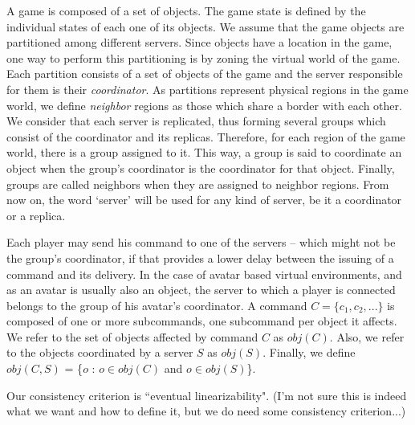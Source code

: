 \documentclass[times, 10pt]{article}
\begin{document}
A game is composed of a set of objects. The game state is defined by the individual states of each one of its objects. We assume that the game objects are partitioned among different servers. Since objects have a location in the game, one way to perform this partitioning is by zoning the virtual world of the game. Each partition consists of a set of objects of the game and the server responsible for them is their \emph{coordinator}. As partitions represent physical regions in the game world, we define \emph{neighbor} regions as those which share a border with each other. We consider that each server is replicated, thus forming several groups which consist of the coordinator and its replicas. Therefore, for each region of the game world, there is a group assigned to it. This way, a group is said to coordinate an object when the group's coordinator is the coordinator for that object. Finally, groups are called neighbors when they are assigned to neighbor regions. From now on, the word `server' will be used for any kind of server, be it a coordinator or a replica.

Each player may send his command to one of the servers -- which might not be the group's coordinator, if that provides a lower delay between the issuing of a command and its delivery. In the case of avatar based virtual environments, and as an avatar is usually also an object, the server to which a player is connected belongs to the group of his avatar's coordinator. A command $C = \{ c_1, c_2, ... \}$ is composed of one or more subcommands, one subcommand per object it affects. We refer to the set of objects affected by command $C$ as $obj(C)$. Also, we refer to the objects coordinated by a server $S$ as $obj(S)$. Finally, we define $obj(C,S)$ = \{$o$ : $o \in obj(C)$ and $o \in obj(S)$\}.


Our consistency criterion is ``eventual linearizability". (I'm not sure this is indeed what we want and how to define it, but we do need some consistency criterion...)
\end{document}
